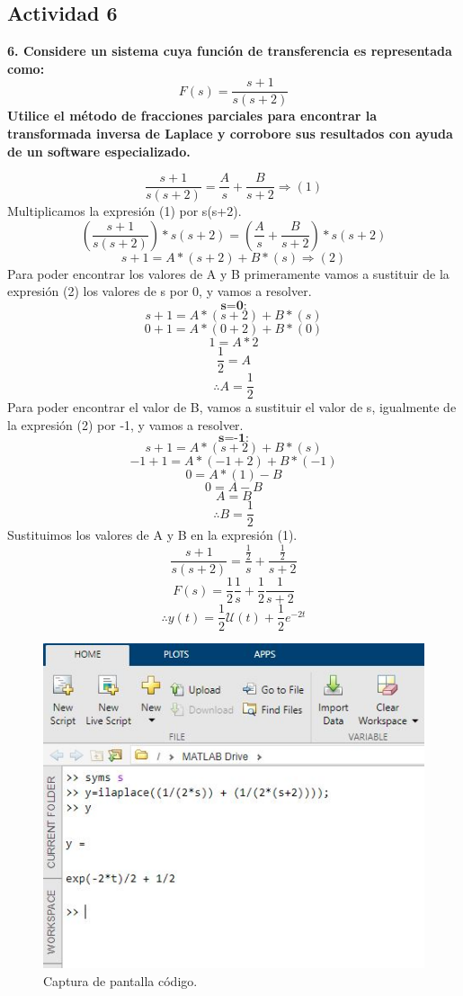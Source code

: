 \subsection{Actividad 6}
\noindent\textbf{6. Considere un sistema cuya función de transferencia es representada como:}
$$
F(s)=\frac{s+1}{s(s+2)}
$$
\textbf{Utilice el método de fracciones parciales para encontrar la transformada inversa de Laplace y corrobore sus resultados con ayuda de un software especializado.}

$$
\frac{s+1}{s(s+2)}=\frac{A}{s}+\frac{B}{s+2}{\Longrightarrow}(1)
$$
Multiplicamos la expresión (1) por s(s+2).
$$
(\frac{s+1}{s(s+2)})*s(s+2)=(\frac{A}{s}+\frac{B}{s+2})*s(s+2)
$$
$$
s+1=A*(s+2)+B*(s){\Longrightarrow}(2)
$$
Para poder encontrar los valores de A y B primeramente vamos a sustituir de la expresión (2) los valores de s por 0, y vamos a resolver.
$$
\textbf{s=0:}
$$
$$
s+1=A*(s+2)+B*(s)
$$
$$
0+1=A*(0+2)+B*(0)
$$
$$
1=A*2
$$
$$
\frac{1}{2}=A
$$
$$
\therefore A=\frac{1}{2}
$$
Para poder encontrar el valor de B, vamos a sustituir el valor de s, igualmente de la expresión (2) por -1, y vamos a resolver.
$$
\textbf{s=-1:}
$$
$$
s+1=A*(s+2)+B*(s)
$$
$$
-1+1=A*(-1+2)+B*(-1)
$$
$$
0=A*(1)-B
$$
$$
0=A-B
$$
$$
A=B
$$
$$
\therefore B=\frac{1}{2}
$$
Sustituimos los valores de A y B en la expresión (1).
$$
\frac{s+1}{s(s+2)}=\frac{\frac{1}{2}}{s}+\frac{\frac{1}{2}}{s+2}
$$
$$
F(s)=\frac{1}{2}\frac{1}{s}+\frac{1}{2}\frac{1}{s+2}
$$
$$
\therefore{y(t)=\frac{1}{2}\mathscr{U}(t)+\frac{1}{2}e^{-2t}}
$$

\begin{figure}[H]
	\centering
	\includegraphics[scale=0.8]{img/mAT}
	\caption{Captura de pantalla código.}
	\label{fig:mat}
\end{figure}



